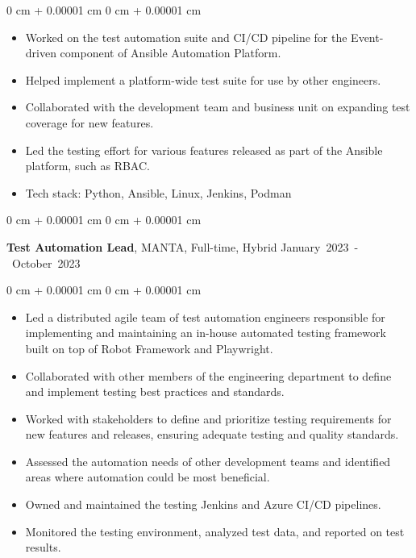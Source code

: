 \documentclass[10pt, a4paper]{article}
\newenvironment{highlights}{
    \begin{itemize}[
        topsep=0.10 cm,
        parsep=0.10 cm,
        partopsep=0pt,
        itemsep=0pt,
        leftmargin=0 cm + 10pt
    ]
}{
    \end{itemize}
} %
\newenvironment{onecolentry}{
    \begin{adjustwidth}{
        0 cm + 0.00001 cm
    }{
        0 cm + 0.00001 cm
    }
}{
    \end{adjustwidth}
} %
\newenvironment{twocolentry}[2][]{
    \onecolentry
    \def\secondColumn{#2}
    \setcolumnwidth{\fill, 4.5 cm}
    \begin{paracol}{2}
}{
    \switchcolumn \raggedleft \secondColumn
    \end{paracol}
    \endonecolentry
} %
\begin{document}
        \begin{onecolentry}
            \begin{highlights}
                \item Worked on the test automation suite and CI/CD pipeline for the Event-driven component of Ansible Automation Platform.
                \item Helped implement a platform-wide test suite for use by other engineers.
                \item Collaborated with the development team and business unit on expanding test coverage for new features.
                \item Led the testing effort for various features released as part of the Ansible platform, such as RBAC.
                \item Tech stack: Python, Ansible, Linux, Jenkins, Podman
            \end{highlights}
        \end{onecolentry}

        \vspace{0.5 cm}

        \begin{twocolentry}{
            \small\mbox{January 2023 - October 2023}
        }
            \textbf{Test Automation Lead}, MANTA, Full-time, Hybrid\end{twocolentry}

        \vspace{0.10 cm}
        \begin{onecolentry}
            \begin{highlights}
                \item Led a distributed agile team of test automation engineers responsible for implementing and maintaining an in-house automated testing framework built on top of Robot Framework and Playwright.
                \item Collaborated with other members of the engineering department to define and implement testing best practices and standards.
                \item Worked with stakeholders to define and prioritize testing requirements for new features and releases, ensuring adequate testing and quality standards.
                \item Assessed the automation needs of other development teams and identified areas where automation could be most beneficial.
                \item Owned and maintained the testing Jenkins and Azure CI/CD pipelines.
                \item Monitored the testing environment, analyzed test data, and reported on test results.
            \end{highlights}
        \end{onecolentry}
\end{document}
